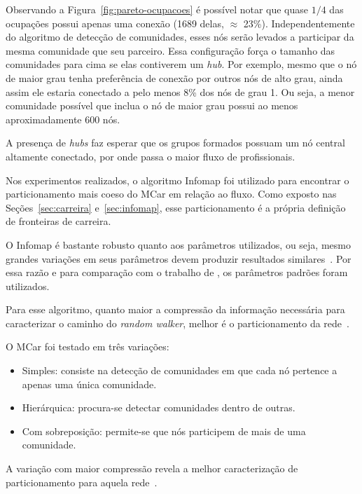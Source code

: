 \documentclass[
  article,
  11pt,
  a4paper,
  english,
  brazil,
  sumario=tradicional]{abntex2}
\begin{document}
Observando a Figura~\ref{fig:pareto-ocupacoes} é possível notar que quase $1/4$ das ocupações possui apenas uma conexão (1689 delas, $\approx$ 23\%). Independentemente do algoritmo de detecção de comunidades, esses nós serão levados a participar da mesma comunidade que seu parceiro. Essa configuração força o tamanho das comunidades para cima se elas contiverem um \textit{hub}. Por exemplo, mesmo que o nó de maior grau tenha preferência de conexão por outros nós de alto grau, ainda assim ele estaria conectado a pelo menos 8\% dos nós de grau 1. Ou seja, a menor comunidade possível que inclua o nó de maior grau possui ao menos aproximadamente 600 nós.

A presença de \textit{hubs} faz esperar que os grupos formados possuam um nó central altamente conectado, por onde passa o maior fluxo de profissionais.


Nos experimentos realizados, o algoritmo Infomap foi utilizado para encontrar o particionamento mais coeso do MCar em relação ao fluxo. Como exposto nas Seções~\ref{sec:carreira} e~\ref{sec:infomap}, esse particionamento é a própria definição de fronteiras de carreira.

O Infomap é bastante robusto quanto aos parâmetros utilizados, ou seja, mesmo grandes variações em seus parâmetros devem produzir resultados similares~\cite{Kawamoto2015-ha,Lambiotte2012-fp}. Por essa razão e para comparação com o trabalho de , os parâmetros padrões foram utilizados.

Para esse algoritmo, quanto maior a compressão da informação necessária para caracterizar o caminho do \textit{random walker}, melhor é o particionamento da rede~\cite{Rosvall2009-sd}.

O MCar foi testado em três variações: 
\begin{itemize}
\item Simples: consiste na detecção de comunidades em que cada nó pertence a apenas uma única comunidade. 
\item Hierárquica: procura-se detectar comunidades dentro de outras. 
\item Com sobreposição: permite-se que nós participem de mais de uma comunidade.
\end{itemize}

A variação com maior compressão revela a melhor caracterização de particionamento para aquela rede~\cite{Viamontes_Esquivel2011-it,Rosvall2011-yi}.
\end{document}
